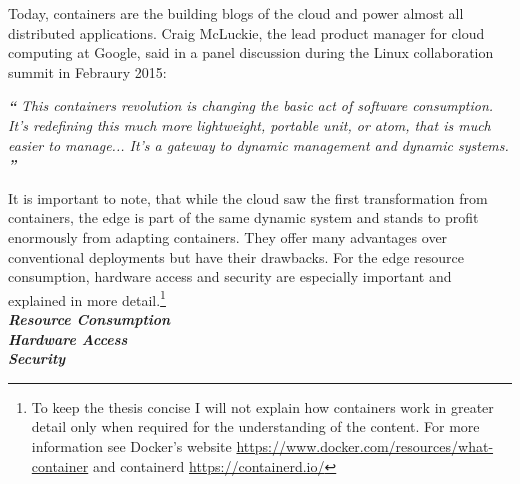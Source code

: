 Today, containers are the building blogs of the cloud and power almost all distributed applications. Craig McLuckie, the lead product manager for cloud computing at Google, said in a panel discussion during the Linux collaboration summit in Febraury 2015:
\begin{displayquote}
\textit{\textbf{\large{``}}}
\textit{This containers revolution is changing the basic act of software consumption. It’s redefining this much more lightweight, portable unit, or atom, that is much easier to manage... It’s a gateway to dynamic management and dynamic systems.}
\textit{\textbf{\large{''}}}
\end{displayquote}
It is important to note, that while the cloud saw the first transformation from containers, the edge is part of the same dynamic system and stands to profit enormously from adapting containers. They offer many advantages over conventional deployments but have their drawbacks. For the edge resource consumption, hardware access and security are especially important and explained in more detail.\footnote{To keep the thesis concise I will not explain how containers work in greater detail only when required for the understanding of the content. For more information see Docker's website  \url{https://www.docker.com/resources/what-container} and containerd \url{https://containerd.io/}}\\[5mm]
\textbf{\textit{Resource Consumption}}\\

\textbf{\textit{Hardware Access}}\\

\textbf{\textit{Security}}\\




